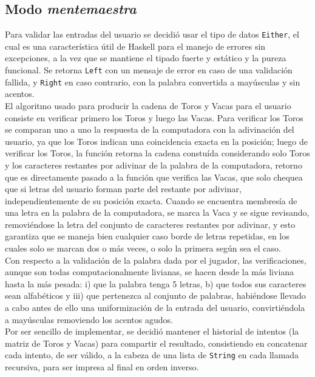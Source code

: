 \documentclass[11pt]{article}
\begin{document}
\subsection{Modo \emph{mentemaestra}}

Para validar las entradas del usuario se decidió usar el tipo de datos \texttt{Either}, el cual es una característica útil de Haskell para el manejo de errores sin excepciones, a la vez que se mantiene el tipado fuerte y estático y la pureza funcional. Se retorna \texttt{Left} con un mensaje de error en caso de una validación fallida, y \texttt{Right} en caso contrario, con la palabra convertida a mayúsculas y sin acentos. \\

El algoritmo usado para producir la cadena de Toros y Vacas para el usuario
consiste en verificar primero los Toros y luego las Vacas. Para verificar los 
Toros se comparan uno a uno la respuesta de la computadora con la adivinación 
del usuario, ya que los Toros indican una coincidencia exacta en la posición; 
luego de verificar los Toros, la función retorna la cadena constuída 
considerando solo Toros y los caracteres restantes por adivinar de la palabra 
de la computadora, retorno que es directamente pasado a la función que 
verifica las Vacas, que solo chequea que si letras del usuario forman parte 
del restante por adivinar, independientemente de su posición exacta. Cuando se 
encuentra membresía de una letra en la palabra de la computadora, se marca la 
Vaca y se sigue revisando, removiéndose la letra del conjunto de caracteres 
restantes por adivinar, y esto garantiza que se maneja bien cualquier caso 
borde de letras repetidas, en los cuales solo se marcan dos o más veces, o 
solo la primera según sea el caso. \\

Con respecto a la validación de la palabra dada por el jugador, las 
verificaciones, aunque son todas computacionalmente livianas, se hacen desde 
la más liviana hasta la más pesada: i) que la palabra tenga 5 letras, b) que 
todos sus caracteres sean alfabéticos y iii) que pertenezca al conjunto de 
palabras, habiéndose llevado a cabo antes de ello una uniformización de la 
entrada del usuario, convirtiéndola a mayúsculas removiendo los acentos agudos. \\

Por ser sencillo de implementar, se decidió mantener el historial de intentos 
(la matriz de Toros y Vacas) para compartir el resultado, consistiendo en 
concatenar cada intento, de ser válido, a la cabeza de una lista de \texttt
{String} en cada llamada recursiva, para ser impresa al final en orden inverso.
\end{document}
